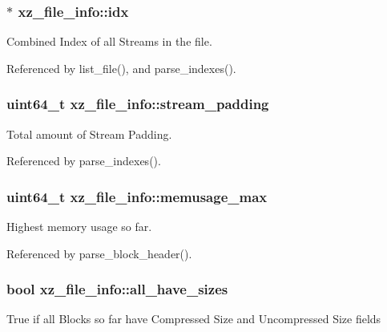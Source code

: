 \subsubsection[{idx}]{$\ast$ xz\-\_\-file\-\_\-info\-::idx}\label{structxz__file__info_a76baee4f8b030ed51e82f52a3eab7b82}


Combined Index of all Streams in the file. 



Referenced by list\-\_\-file(), and parse\-\_\-indexes().

\subsubsection[{stream\-\_\-padding}]{\setlength{\rightskip}{0pt plus 5cm}uint64\-\_\-t xz\-\_\-file\-\_\-info\-::stream\-\_\-padding}\label{structxz__file__info_a5a4120e2aef7ba7d162fcd6b79bc6f8c}


Total amount of Stream Padding. 



Referenced by parse\-\_\-indexes().

\subsubsection[{memusage\-\_\-max}]{\setlength{\rightskip}{0pt plus 5cm}uint64\-\_\-t xz\-\_\-file\-\_\-info\-::memusage\-\_\-max}\label{structxz__file__info_a8f1b065dd64bc47ada4911db1967c417}


Highest memory usage so far. 



Referenced by parse\-\_\-block\-\_\-header().

\subsubsection[{all\-\_\-have\-\_\-sizes}]{\setlength{\rightskip}{0pt plus 5cm}bool xz\-\_\-file\-\_\-info\-::all\-\_\-have\-\_\-sizes}\label{structxz__file__info_a62fca83737e92ef88fc8d1d26c94f3ec}
True if all Blocks so far have Compressed Size and Uncompressed Size fields 


